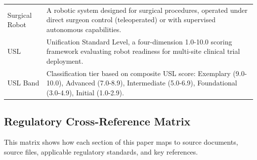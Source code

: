 \begin{longtable}{>{\raggedright\arraybackslash}p{4.5cm} >{\raggedright\arraybackslash}p{11cm}}
Surgical Robot & A robotic system designed for surgical procedures, operated under direct surgeon control (teleoperated) or with supervised autonomous capabilities. \\
USL & Unification Standard Level, a four-dimension 1.0-10.0 scoring framework evaluating robot readiness for multi-site clinical trial deployment. \\
USL Band & Classification tier based on composite USL score: Exemplary (9.0-10.0), Advanced (7.0-8.9), Intermediate (5.0-6.9), Foundational (3.0-4.9), Initial (1.0-2.9). \\
\end{longtable}

\newpage

\subsection{Regulatory Cross-Reference Matrix}
\label{app:cross-reference}

This matrix shows how each section of this paper maps to source documents,
source files, applicable regulatory standards, and key references.

